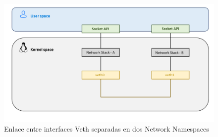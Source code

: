 \begin{figure}[ht]
    \centering
    \includegraphics[width=15.5cm]{archivos/img/teoria/user_kernel.png}
    \caption{Enlace entre interfaces Veth separadas en dos Network Namespaces}
    \label{fig:linuxNet_veth}
\end{figure}